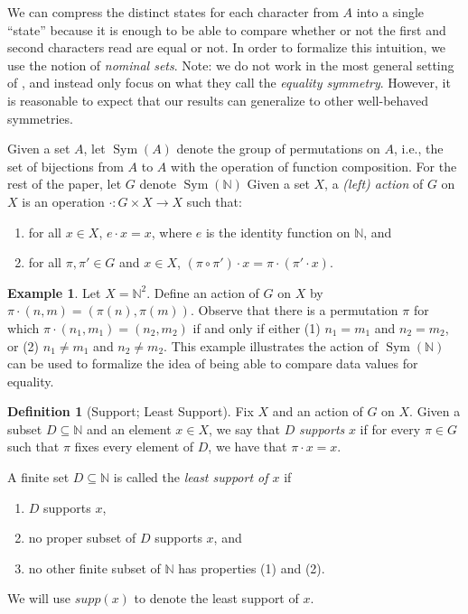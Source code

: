 \documentclass[11pt,a4paper]{amsart}
\theoremstyle{definition}
\newtheorem{definition}{Definition}
\newtheorem{example}{Example}
\newcommand{\bb}{\mathbb}
\DeclareMathOperator{\Sym}{Sym}
\begin{document}
We can compress the distinct states for each character from $A$ into a single ``state'' because it is enough to be able to compare whether or not the first and second characters read are equal or not.
In order to formalize this intuition, we use the notion of \emph{nominal sets}.
Note: we do not work in the most general setting of \cite{bojanczyk-klin-lasota:automata-theory-in-nominal-sets}, and instead only focus on what they call the \textit{equality symmetry}.
However, it is reasonable to expect that our results can generalize to other well-behaved symmetries.

Given a set $A$, let $\Sym(A)$ denote the group of permutations on $A$, i.e., the set of bijections from $A$ to $A$ with the operation of function composition.
For the rest of the paper, let $G$ denote $\Sym(\bb N)$
Given a set $X$, a \emph{(left) action} of $G$ on $X$ is an operation $\cdot : G \times X \to X$ such that:
\begin{enumerate}[1)]
    \item for all $x \in X$, $e \cdot x = x$, where $e$ is the identity function on $\bb N$, and 
    \item for all $\pi,\pi' \in G$ and $x \in X$, $(\pi \circ \pi') \cdot x = \pi \cdot (\pi' \cdot x)$.
\end{enumerate}

\begin{example} \label{eg:examples of group actions}
    Let $X = \bb N^2$. 
    Define an action of $G$ on $X$ by $\pi \cdot (n,m) = (\pi(n), \pi(m))$.
    Observe that there is a permutation $\pi$ for which $\pi \cdot (n_1, m_1) = (n_2, m_2)$ if and only if either (1) $n_1 = m_1$ and $n_2 = m_2$, or (2) $n_1 \neq m_1$ and $n_2 \neq m_2$. 
    This example illustrates the action of $\Sym(\bb N)$ can be used to formalize the idea of being able to compare data values for equality.
\end{example}

\begin{definition}[Support; Least Support]
    Fix $X$ and an action of $G$ on $X$.
    Given a subset $D \subseteq \bb N$ and an element $x \in X$, we say that $D$ \emph{supports} $x$ if for every $\pi \in G$ such that $\pi$ fixes every element of $D$, we have that $\pi \cdot x = x$.

    A finite set $D \subseteq \bb N$ is called the \emph{least support of $x$} if 
    \begin{enumerate}[(1)]
        \item $D$ supports $x$, 
        \item no proper subset of $D$ supports $x$, and 
        \item no other finite subset of $\bb N$ has properties (1) and (2).
    \end{enumerate}
    We will use $supp(x)$ to denote the least support of $x$.
\end{definition}
\end{document}
